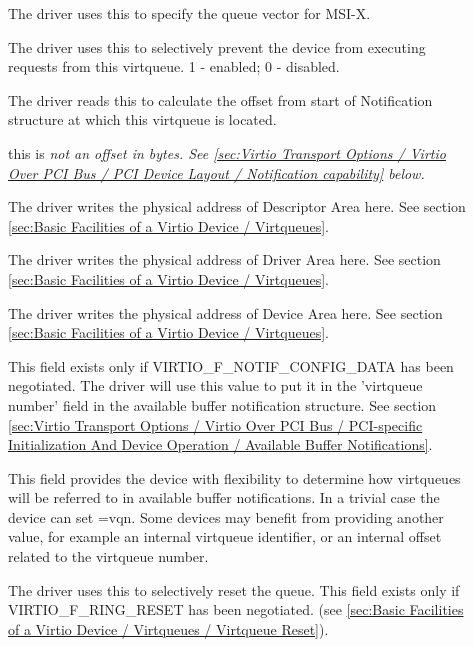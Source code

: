 \begin{description}
\item[]
        The driver uses this to specify the queue vector for MSI-X.

\item[]
        The driver uses this to selectively prevent the device from executing requests from this virtqueue.
        1 - enabled; 0 - disabled.

\item[]
        The driver reads this to calculate the offset from start of Notification structure at
        which this virtqueue is located.
        \begin{note} this is \em{not} an offset in bytes.
        See \ref{sec:Virtio Transport Options / Virtio Over PCI Bus / PCI Device Layout / Notification capability} below.
        \end{note}

\item[]
        The driver writes the physical address of Descriptor Area here.  See section \ref{sec:Basic Facilities of a Virtio Device / Virtqueues}.

\item[]
        The driver writes the physical address of Driver Area here.  See section \ref{sec:Basic Facilities of a Virtio Device / Virtqueues}.

\item[]
        The driver writes the physical address of Device Area here.  See section \ref{sec:Basic Facilities of a Virtio Device / Virtqueues}.

\item[]
        This field exists only if VIRTIO_F_NOTIF_CONFIG_DATA has been negotiated.
        The driver will use this value to put it in the 'virtqueue number' field
        in the available buffer notification structure.
        See section \ref{sec:Virtio Transport Options / Virtio Over PCI Bus / PCI-specific Initialization And Device Operation / Available Buffer Notifications}.
        \begin{note}
        This field provides the device with flexibility to determine how virtqueues
        will be referred to in available buffer notifications.
        In a trivial case the device can set =vqn. Some devices
        may benefit from providing another value, for example an internal virtqueue
        identifier, or an internal offset related to the virtqueue number.
        \end{note}

\item[]
        The driver uses this to selectively reset the queue.
        This field exists only if VIRTIO_F_RING_RESET has been
        negotiated. (see \ref{sec:Basic Facilities of a Virtio Device / Virtqueues / Virtqueue Reset}).

\end{description}

